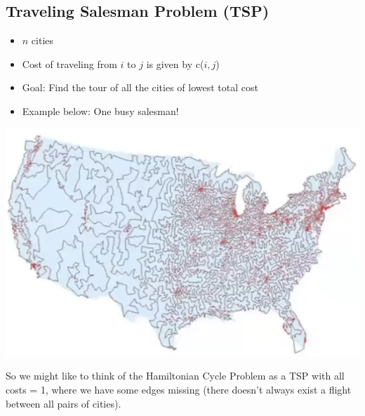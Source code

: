 \documentclass[10pt]{article}
\begin{document}
\subsection*{Traveling Salesman Problem (TSP)}
\begin{itemize}
    \item $n$ cities
    \item Cost of traveling from $i$ to $j$ is given by c($i, j$)
    \item Goal: Find the tour of all the cities of lowest total cost
    \item Example below: One busy salesman!
\end{itemize}
\begin{center}
    \includegraphics*[scale=0.9]{W4_2.png}
\end{center}
So we might like to think of the Hamiltonian Cycle Problem as a TSP with all costs = 1, where we have some edges missing (there doesn't always exist a flight between all pairs of cities).
\end{document}
